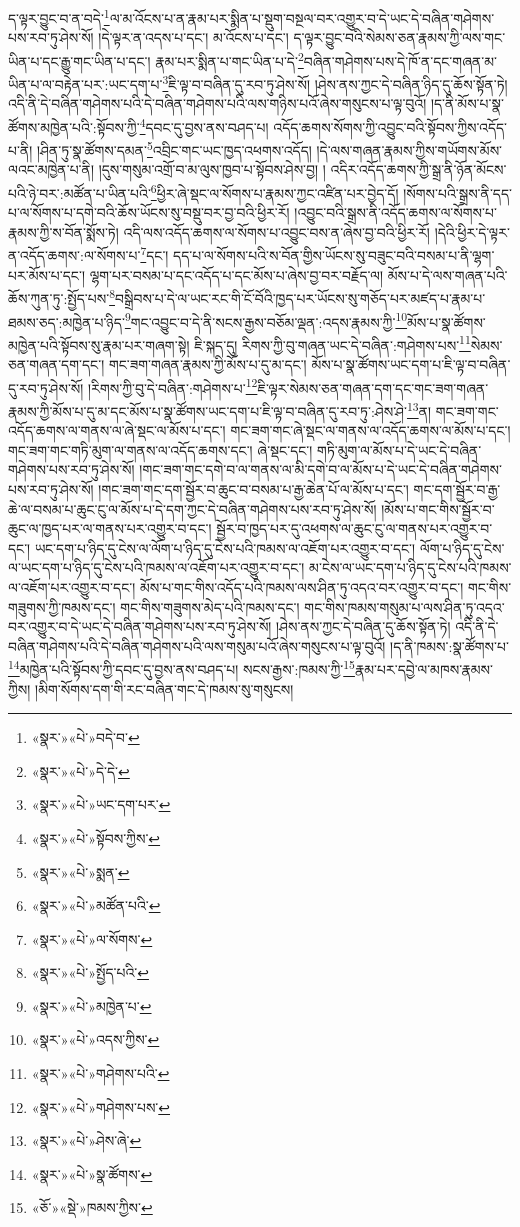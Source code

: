 ད་ལྟར་བྱུང་བ་ན་བདེ་\footnote{«སྣར་»«པེ་»བདེ་བ་}ལ་མ་འོངས་པ་ན་རྣམ་པར་སྨིན་པ་སྡུག་བསྔལ་བར་འགྱུར་བ་དེ་ཡང་དེ་བཞིན་གཤེགས་པས་རབ་ཏུ་ཤེས་སོ། །དེ་ལྟར་ན་འདས་པ་དང་། མ་འོངས་པ་དང་། ད་ལྟར་བྱུང་བའི་སེམས་ཅན་རྣམས་ཀྱི་ལས་གང་ཡིན་པ་དང་རྒྱུ་གང་ཡིན་པ་དང་། རྣམ་པར་སྨིན་པ་གང་ཡིན་པ་དེ་\footnote{«སྣར་»«པེ་»དེ་དེ་}བཞིན་གཤེགས་པས་དེ་ཁོ་ན་དང་གཞན་མ་ཡིན་པ་ལ་བརྟེན་པར་:ཡང་དག་པ་\footnote{«སྣར་»«པེ་»ཡང་དག་པར་}ཇི་ལྟ་བ་བཞིན་དུ་རབ་ཏུ་ཤེས་སོ། །ཤེས་ནས་ཀྱང་དེ་བཞིན་ཉིད་དུ་ཆོས་སྟོན་ཏེ། འདི་ནི་དེ་བཞིན་གཤེགས་པའི་དེ་བཞིན་གཤེགས་པའི་ལས་གཉིས་པའོ་ཞེས་གསུངས་པ་ལྟ་བུའོ། །ད་ནི་མོས་པ་སྣ་ཚོགས་མཁྱེན་པའི་:སྟོབས་ཀྱི་\footnote{«སྣར་»«པེ་»སྟོབས་ཀྱིས་}དབང་དུ་བྱས་ནས་བཤད་པ། འདོད་ཆགས་སོགས་ཀྱི་འབྱུང་བའི་སྟོབས་ཀྱིས་འདོད་པ་ནི། །ཤིན་ཏུ་སྣ་ཚོགས་དམན་\footnote{«སྣར་»«པེ་»སྨན་}འབྲིང་གང་ཡང་ཁྱད་འཕགས་འདོད། །དེ་ལས་གཞན་རྣམས་ཀྱིས་གཡོགས་མོས་ལའང་མཁྱེན་པ་ནི། །དུས་གསུམ་འགྲོ་བ་མ་ལུས་ཁྱབ་པ་སྟོབས་ཤེས་བྱ། །
འདིར་འདོད་ཆགས་ཀྱི་སྒྲ་ནི་ཉོན་མོངས་པའི་ཉེ་བར་:མཚོན་པ་ཡིན་པའི་\footnote{«སྣར་»«པེ་»མཚོན་པའི་}ཕྱིར་ཞེ་སྡང་ལ་སོགས་པ་རྣམས་ཀྱང་འཛིན་པར་བྱེད་དོ། །སོགས་པའི་སྒྲས་ནི་དད་པ་ལ་སོགས་པ་དགེ་བའི་ཆོས་ཡོངས་སུ་བསྡུ་བར་བྱ་བའི་ཕྱིར་རོ། །འབྱུང་བའི་སྒྲས་ནི་འདོད་ཆགས་ལ་སོགས་པ་རྣམས་ཀྱི་ས་བོན་སྨོས་ཏེ། འདི་ལས་འདོད་ཆགས་ལ་སོགས་པ་འབྱུང་བས་ན་ཞེས་བྱ་བའི་ཕྱིར་རོ། །དེའི་ཕྱིར་དེ་ལྟར་ན་འདོད་ཆགས་:ལ་སོགས་པ་\footnote{«སྣར་»«པེ་»ལ་སོགས་}དང་། དད་པ་ལ་སོགས་པའི་ས་བོན་གྱིས་ཡོངས་སུ་བཟུང་བའི་བསམ་པ་ནི་ལྷག་པར་མོས་པ་དང་། ལྷག་པར་བསམ་པ་དང་འདོད་པ་དང་མོས་པ་ཞེས་བྱ་བར་བརྗོད་ལ། མོས་པ་དེ་ལས་གཞན་པའི་ཆོས་ཀུན་ཏུ་:སྤྱོད་པས་\footnote{«སྣར་»«པེ་»སྤྱོད་པའི་}བསྒྲིབས་པ་དེ་ལ་ཡང་རང་གི་ངོ་བོའི་ཁྱད་པར་ཡོངས་སུ་གཅོད་པར་མཛད་པ་རྣམ་པ་ཐམས་ཅད་:མཁྱེན་པ་ཉིད་\footnote{«སྣར་»«པེ་»མཁྱེན་པ་}གང་འབྱུང་བ་དེ་ནི་སངས་རྒྱས་བཅོམ་ལྡན་:འདས་རྣམས་ཀྱི་\footnote{«སྣར་»«པེ་»འདས་ཀྱིས་}མོས་པ་སྣ་ཚོགས་མཁྱེན་པའི་སྟོབས་སུ་རྣམ་པར་གཞག་སྟེ། ཇི་སྐད་དུ། རིགས་ཀྱི་བུ་གཞན་ཡང་དེ་བཞིན་:གཤེགས་པས་\footnote{«སྣར་»«པེ་»གཤེགས་པའི་}སེམས་ཅན་གཞན་དག་དང་། གང་ཟག་གཞན་རྣམས་ཀྱི་མོས་པ་དུ་མ་དང་། མོས་པ་སྣ་ཚོགས་ཡང་དག་པ་ཇི་ལྟ་བ་བཞིན་དུ་རབ་ཏུ་ཤེས་སོ། །རིགས་ཀྱི་བུ་དེ་བཞིན་:གཤེགས་པ་\footnote{«སྣར་»«པེ་»གཤེགས་པས་}ཇི་ལྟར་སེམས་ཅན་གཞན་དག་དང་གང་ཟག་གཞན་རྣམས་ཀྱི་མོས་པ་དུ་མ་དང་མོས་པ་སྣ་ཚོགས་ཡང་དག་པ་ཇི་ལྟ་བ་བཞིན་དུ་རབ་ཏུ་:ཤེས་ཤེ་\footnote{«སྣར་»«པེ་»ཤེས་ཞེ་}ན། གང་ཟག་གང་འདོད་ཆགས་ལ་གནས་ལ་ཞེ་སྡང་ལ་མོས་པ་དང་། གང་ཟག་གང་ཞེ་སྡང་ལ་གནས་ལ་འདོད་ཆགས་ལ་མོས་པ་དང་། གང་ཟག་གང་གཏི་མུག་ལ་གནས་ལ་འདོད་ཆགས་དང་། ཞེ་སྡང་དང་། གཏི་མུག་ལ་མོས་པ་དེ་ཡང་དེ་བཞིན་གཤེགས་པས་རབ་ཏུ་ཤེས་སོ། །གང་ཟག་གང་དགེ་བ་ལ་གནས་ལ་མི་དགེ་བ་ལ་མོས་པ་དེ་ཡང་དེ་བཞིན་གཤེགས་པས་རབ་ཏུ་ཤེས་སོ། །གང་ཟག་གང་དག་སྦྱོར་བ་ཆུང་བ་བསམ་པ་རྒྱ་ཆེན་པོ་ལ་མོས་པ་དང་། གང་དག་སྦྱོར་བ་རྒྱ་ཆེ་ལ་བསམ་པ་ཆུང་ངུ་ལ་མོས་པ་དེ་དག་ཀྱང་དེ་བཞིན་གཤེགས་པས་རབ་ཏུ་ཤེས་སོ། །མོས་པ་གང་གིས་སྦྱོར་བ་ཆུང་ལ་ཁྱད་པར་ལ་གནས་པར་འགྱུར་བ་དང་། སྦྱོར་བ་ཁྱད་པར་དུ་འཕགས་ལ་ཆུང་ངུ་ལ་གནས་པར་འགྱུར་བ་དང་། ཡང་དག་པ་ཉིད་དུ་ངེས་ལ་ལོག་པ་ཉིད་དུ་ངེས་པའི་ཁམས་ལ་འཇོག་པར་འགྱུར་བ་དང་། ལོག་པ་ཉིད་དུ་ངེས་ལ་ཡང་དག་པ་ཉིད་དུ་ངེས་པའི་ཁམས་ལ་འཇོག་པར་འགྱུར་བ་དང་། མ་ངེས་ལ་ཡང་དག་པ་ཉིད་དུ་ངེས་པའི་ཁམས་ལ་འཇོག་པར་འགྱུར་བ་དང་། མོས་པ་གང་གིས་འདོད་པའི་ཁམས་ལས་ཤིན་ཏུ་འདའ་བར་འགྱུར་བ་དང་། གང་གིས་གཟུགས་ཀྱི་ཁམས་དང་། གང་གིས་གཟུགས་མེད་པའི་ཁམས་དང་། གང་གིས་ཁམས་གསུམ་པ་ལས་ཤིན་ཏུ་འདའ་བར་འགྱུར་བ་དེ་ཡང་དེ་བཞིན་གཤེགས་པས་རབ་ཏུ་ཤེས་སོ། །ཤེས་ནས་ཀྱང་དེ་བཞིན་དུ་ཆོས་སྟོན་ཏེ། འདི་ནི་དེ་བཞིན་གཤེགས་པའི་དེ་བཞིན་གཤེགས་པའི་ལས་གསུམ་པའོ་ཞེས་གསུངས་པ་ལྟ་བུའོ། །ད་ནི་ཁམས་:སྣ་ཚོགས་པ་\footnote{«སྣར་»«པེ་»སྣ་ཚོགས་}མཁྱེན་པའི་སྟོབས་ཀྱི་དབང་དུ་བྱས་ནས་བཤད་པ། སངས་རྒྱས་:ཁམས་ཀྱི་\footnote{«ཅོ་»«སྡེ་»ཁམས་ཀྱིས་}རྣམ་པར་དབྱེ་ལ་མཁས་རྣམས་ཀྱིས། །མིག་སོགས་དག་གི་རང་བཞིན་གང་དེ་ཁམས་སུ་གསུངས། 